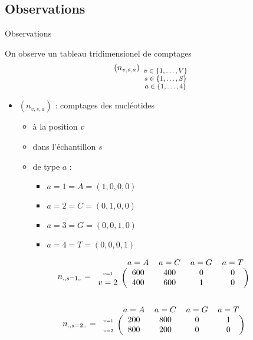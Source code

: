 \documentclass{beamer}
\newcommand{\fr}[1]{#1}
\newcommand{\en}[1]{}
\begin{document}
\subsection{Observations}
\begin{frame}{Observations}

\en{We observe a 3 dimensional array of counts.}
\fr{On observe un tableau tridimensionel de comptages}
$$\left(n_{v,s,a}\right)_{\footnotesize\begin{array}{c}
v\in\{1,\ldots,V\}\\
s\in\{1,\ldots,S\}\\
a\in \{1,\ldots,4\}\end{array}}$$

\begin{itemize}
\item $(n_{v,s,a})$ : \fr{comptages des nucléotides}\en{counts of nucleotides}
    \begin{itemize}
\item \fr{à la position}\en{at position} $v$
\item \fr{dans l'échantillon}\en{in sample} $s$
\item \fr{de type}\en{of type} $a$ :
    \begin{itemize}
    \item $a=1=A=(1,0,0,0)$
    \item $a=2=C=(0,1,0,0)$
    \item $a=3=G=(0,0,1,0)$
    \item $a=4=T=(0,0,0,1)$
    \end{itemize}
\end{itemize}
\end{itemize}
\end{frame}

\begin{frame}
    $$n_{.,s=1,.}=\begin{blockarray}{ccccc}
    &a=A&a=C&a=G&a=T&\\
    \begin{block}{c(cccc)}
 {\scriptscriptstyle v=1}&600&400&0&0\\   
 v=2&400&600&1&0\\
    \end{block}
\end{blockarray} $$


$$n_{.,s=2,.}=\begin{blockarray}{ccccc}
    &a=A&a=C&a=G&a=T&\\
    \begin{block}{c(cccc)}
{\scriptscriptstyle v=1}&200&800&0&1\\   
  {\scriptscriptstyle v=2}&800&200&0&0\\
    \end{block}
\end{blockarray} $$

\end{frame}
\end{document}
